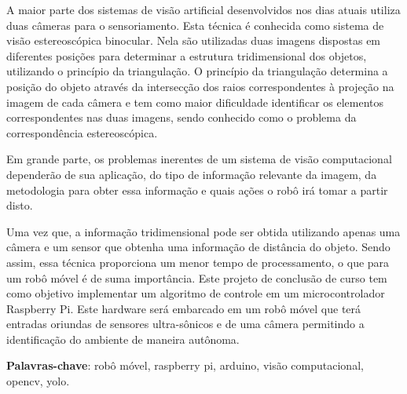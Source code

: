 
\begin{resumo}
A maior parte dos sistemas de visão artificial desenvolvidos nos dias atuais utiliza duas câmeras para o sensoriamento. Esta técnica é conhecida como sistema de visão estereoscópica binocular. Nela são utilizadas duas imagens dispostas em diferentes posições para determinar a estrutura tridimensional dos objetos, utilizando o princípio da triangulação. O princípio da triangulação determina a posição do objeto através da intersecção dos raios correspondentes à projeção na imagem de cada câmera e tem como maior dificuldade identificar os elementos correspondentes nas duas imagens, sendo conhecido como o problema da correspondência estereoscópica. 

Em grande parte, os problemas inerentes de um sistema de visão computacional dependerão de sua aplicação, do tipo de informação relevante da imagem, da metodologia para obter essa informação e quais ações o robô irá tomar a partir disto.

Uma vez que, a informação tridimensional pode ser obtida utilizando apenas uma câmera e um sensor que obtenha uma informação de distância do objeto. Sendo assim, essa técnica proporciona um menor tempo de processamento, o que para um robô móvel é de suma importância. Este projeto de conclusão de curso tem como objetivo implementar um algoritmo de controle em um microcontrolador Raspberry Pi. Este hardware será embarcado em um robô móvel que terá entradas oriundas de sensores ultra-sônicos e  de uma câmera permitindo a identificação do ambiente de maneira autônoma.

\vspace{\onelineskip}
\noindent
\textbf{Palavras-chave}: robô móvel, raspberry pi, arduino, visão computacional, opencv, yolo.
\end{resumo}

        


